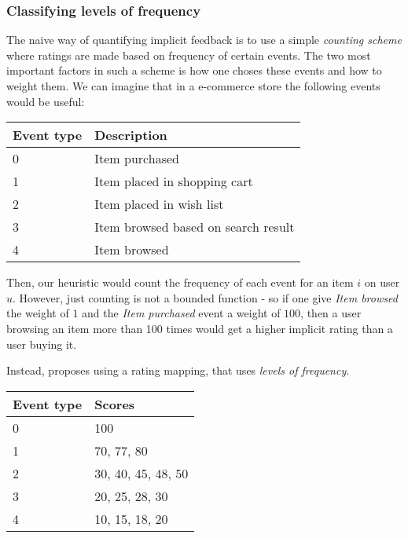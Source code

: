 \subsubsection{Classifying levels of frequency}

The naive way of quantifying implicit feedback is to use a simple
\textit{counting scheme} where ratings are made based on frequency of certain
events. The two most important factors in such a scheme is how one choses these
events and how to weight them. We can imagine that in a e-commerce store the
following events would be useful:

\begin{table}[h!]
  \begin{tabular}{|l|l|}
  \hline
  Event type & Description \\ \hline
  0 & Item purchased \\
  1 & Item placed in shopping cart \\
  2 & Item placed in wish list \\
  3 & Item browsed based on search result \\
  4 & Item browsed \\
  \hline
  \end{tabular}
\end{table}

Then, our heuristic would count the frequency of each event for an item $i$ on
user $u$. However, just counting is not a bounded function - so if one give
\textit{Item browsed} the weight of $1$ and the \textit{Item purchased} event
a weight of $100$, then a user browsing an item more than 100 times would get a
higher implicit rating than a user buying it.

Instead, \cite{pkghost2014implicit} proposes using a rating mapping, that uses
\textit{levels of frequency}.

\begin{table}[h!]
  \label{implicit-table}
  \begin{tabular}{|l|l|}
  \hline
  Event type & Scores \\ \hline
  0 & 100 \\
  1 & 70, 77, 80 \\
  2 & 30, 40, 45, 48, 50 \\
  3 & 20, 25, 28, 30 \\
  4 & 10, 15, 18, 20 \\
  \hline
  \end{tabular}
\end{table}

